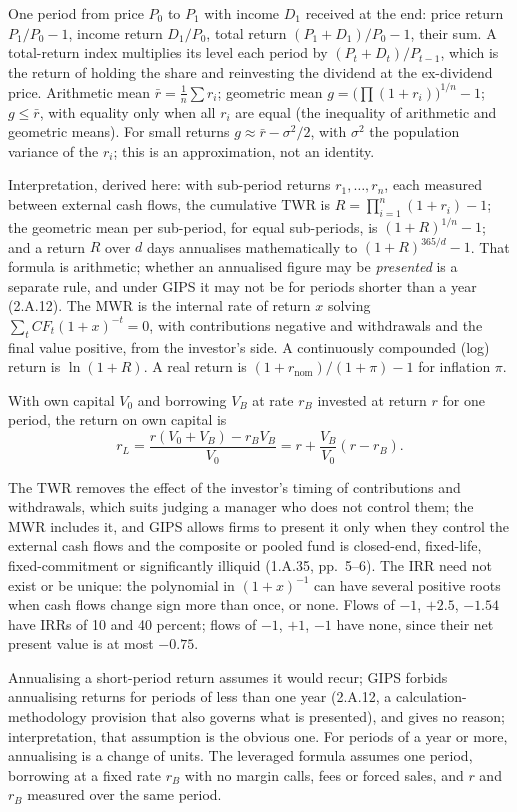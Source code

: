 \begin{qfdefinition}
 One period from price $P_0$ to $P_1$ with income $D_1$ received at the end: price return $P_1/P_0-1$, income return $D_1/P_0$, total return $(P_1+D_1)/P_0-1$, their sum. A total-return index multiplies its level each period by $(P_t+D_t)/P_{t-1}$, which is the return of holding the share and reinvesting the dividend at the ex-dividend price. Arithmetic mean $\bar r=\frac1n\sum r_i$; geometric mean $g=\bigl(\prod(1+r_i)\bigr)^{1/n}-1$; $g\le\bar r$, with equality only when all $r_i$ are equal (the inequality of arithmetic and geometric means). For small returns $g\approx\bar r-\sigma^2/2$, with $\sigma^2$ the population variance of the $r_i$; this is an approximation, not an identity.

Interpretation, derived here: with sub-period returns $r_1,\dots,r_n$, each measured between external cash flows, the cumulative TWR is $R=\prod_{i=1}^n(1+r_i)-1$; the geometric mean per sub-period, for equal sub-periods, is $(1+R)^{1/n}-1$; and a return $R$ over $d$ days annualises mathematically to $(1+R)^{365/d}-1$. That formula is arithmetic; whether an annualised figure may be \emph{presented} is a separate rule, and under GIPS it may not be for periods shorter than a year (2.A.12). The MWR is the internal rate of return $x$ solving $\sum_t CF_t(1+x)^{-t}=0$, with contributions negative and withdrawals and the final value positive, from the investor's side. A continuously compounded (log) return is $\ln(1+R)$. A real return is $(1+r_{\mathrm{nom}})/(1+\pi)-1$ for inflation $\pi$.

With own capital $V_0$ and borrowing $V_B$ at rate $r_B$ invested at return $r$ for one period, the return on own capital is
\[ r_L=\frac{r(V_0+V_B)-r_BV_B}{V_0}=r+\frac{V_B}{V_0}(r-r_B). \]

 The TWR removes the effect of the investor's timing of contributions and withdrawals, which suits judging a manager who does not control them; the MWR includes it, and GIPS allows firms to present it only when they control the external cash flows and the composite or pooled fund is closed-end, fixed-life, fixed-commitment or significantly illiquid (1.A.35, pp.~5--6). The IRR need not exist or be unique: the polynomial in $(1+x)^{-1}$ can have several positive roots when cash flows change sign more than once, or none. Flows of $-1$, $+2.5$, $-1.54$ have IRRs of 10 and 40 percent; flows of $-1$, $+1$, $-1$ have none, since their net present value is at most $-0.75$.

Annualising a short-period return assumes it would recur; GIPS forbids annualising returns for periods of less than one year (2.A.12, a calculation-methodology provision that also governs what is presented), and gives no reason; interpretation, that assumption is the obvious one. For periods of a year or more, annualising is a change of units. The leveraged formula assumes one period, borrowing at a fixed rate $r_B$ with no margin calls, fees or forced sales, and $r$ and $r_B$ measured over the same period.


\end{qfdefinition}
